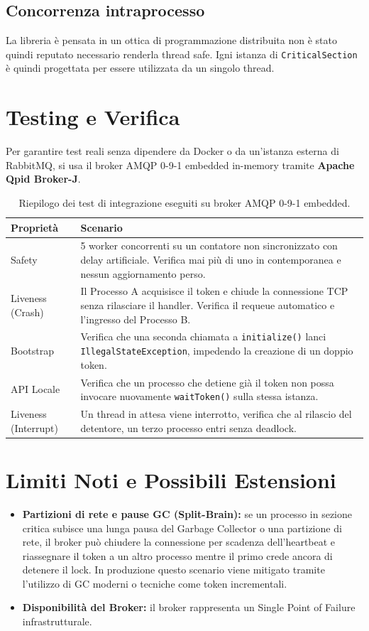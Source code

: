 \documentclass[11pt,a4paper]{article}
\begin{document}
\subsection{Concorrenza intraprocesso}
La libreria è pensata in un ottica di programmazione distribuita non è stato quindi reputato necessario renderla thread safe. Igni istanza di \texttt{CriticalSection} è quindi progettata per essere utilizzata da un singolo thread.

\section{Testing e Verifica}
Per garantire test reali senza dipendere da Docker o da un'istanza esterna di RabbitMQ, si usa il broker AMQP 0-9-1 embedded in-memory tramite \textbf{Apache Qpid Broker-J}.

\begin{table}[h!]
\centering
\renewcommand{\arraystretch}{1.25}
\begin{tabular}{@{}>{\ttfamily\small} p{2.8cm} p{12cm}@{}}
\toprule
\normalfont\textbf{Proprietà} & \textbf{Scenario} \\
\midrule
Safety & 5 worker concorrenti su un contatore non sincronizzato con delay artificiale. Verifica mai più di uno in contemporanea e nessun aggiornamento perso. \\
Liveness (Crash) & Il Processo A acquisisce il token e chiude la connessione TCP senza rilasciare il handler. Verifica il requeue automatico e l'ingresso del Processo B. \\
Bootstrap & Verifica che una seconda chiamata a \texttt{initialize()} lanci \texttt{IllegalStateException}, impedendo la creazione di un doppio token. \\
API Locale & Verifica che un processo che detiene già il token non possa invocare nuovamente \texttt{waitToken()} sulla stessa istanza. \\
Liveness (Interrupt) & Un thread in attesa viene interrotto, verifica che al rilascio del detentore, un terzo processo entri senza deadlock. \\
\bottomrule
\end{tabular}
\caption{Riepilogo dei test di integrazione eseguiti su broker AMQP 0-9-1 embedded.}
\end{table}

\section{Limiti Noti e Possibili Estensioni}
\begin{itemize}
    \item \textbf{Partizioni di rete e pause GC (Split-Brain):} se un processo in sezione critica subisce una lunga pausa del Garbage Collector o una partizione di rete, il broker può chiudere la connessione per scadenza dell'heartbeat e riassegnare il token a un altro processo mentre il primo crede ancora di detenere il lock. In produzione questo scenario viene mitigato tramite l'utilizzo di GC moderni o tecniche come token incrementali.
    \item \textbf{Disponibilità del Broker:} il broker rappresenta un Single Point of Failure infrastrutturale.
\end{itemize}
\end{document}
